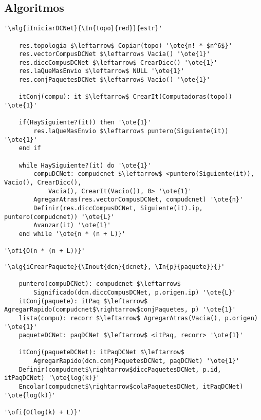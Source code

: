 \subsection{Algoritmos}

\lstset{style=alg}

\begin{lstlisting}[mathescape]
'\alg{iIniciarDCNet}{\In{topo}{red}}{estr}'

    res.topologia $\leftarrow$ Copiar(topo) '\ote{n! * $n^6$}'
    res.vectorCompusDCNet $\leftarrow$ Vacia() '\ote{1}'
    res.diccCompusDCNet $\leftarrow$ CrearDicc() '\ote{1}'
    res.laQueMasEnvio $\leftarrow$ NULL '\ote{1}'
    res.conjPaquetesDCNet $\leftarrow$ Vacio() '\ote{1}'

    itConj(compu): it $\leftarrow$ CrearIt(Computadoras(topo)) '\ote{1}'

    if(HaySiguiente?(it)) then '\ote{1}'
    	res.laQueMasEnvio $\leftarrow$ puntero(Siguiente(it)) '\ote{1}'
    end if

    while HaySiguiente?(it) do '\ote{1}'
    	compuDCNet: compudcnet $\leftarrow$ <puntero(Siguiente(it)), Vacio(), CrearDicc(),
    		Vacia(), CrearIt(Vacio()), 0> '\ote{1}'
    	AgregarAtras(res.vectorCompusDCNet, compudcnet) '\ote{n}'
    	Definir(res.diccCompusDCNet, Siguiente(it).ip, puntero(compudcnet)) '\ote{L}'
    	Avanzar(it) '\ote{1}'
    end while '\ote{n * (n + L)}'

'\ofi{O(n * (n + L))}'
\end{lstlisting}

\begin{lstlisting}[mathescape]
'\alg{iCrearPaquete}{\Inout{dcn}{dcnet}, \In{p}{paquete}}{}'

	puntero(compuDCNet): compudcnet $\leftarrow$
		Significado(dcn.diccCompusDCNet, p.origen.ip) '\ote{L}'
	itConj(paquete): itPaq $\leftarrow$ AgregarRapido(compudcnet$\rightarrow$conjPaquetes, p) '\ote{1}'
	lista(compu): recorr $\leftarrow$ AgregarAtras(Vacia(), p.origen) '\ote{1}'
	paqueteDCNet: paqDCNet $\leftarrow$ <itPaq, recorr> '\ote{1}'

	itConj(paqueteDCNet): itPaqDCNet $\leftarrow$
		AgregarRapido(dcn.conjPaquetesDCNet, paqDCNet) '\ote{1}'
	Definir(compudcnet$\rightarrow$diccPaquetesDCNet, p.id, itPaqDCNet) '\ote{log(k)}'
	Encolar(compudcnet$\rightarrow$colaPaquetesDCNet, itPaqDCNet) '\ote{log(k)}'

'\ofi{O(log(k) + L)}'
\end{lstlisting}

